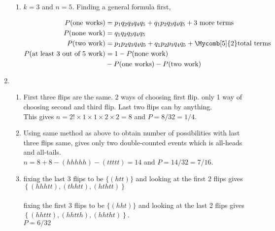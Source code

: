 \begin{enumerate}
\begin{enumerate}
		\item $ k = 3 $ and $ n = 5 $. Finding a general formula first, 
		
		\begin{subequations}
			\begin{align}
				P(\text{one works}) &= p_1 q_2 q_3 q_4 q_5 + q_1 p_2 q_3 q_4 q_5 + \text{3 more terms} \\
				P(\text{none work}) &= q_1 q_2 q_3 q_4 q_5\\
				P(\text{two work}) &= p_1 p_2 q_3 q_4 q_5 + q_1 p_2 p_3 q_4 q_5 + \Mycomb[5]{2}\text{total terms} \\
				P(\text{at least 3 out of 5 work}) &= 1 - P(\text{none work}) \nonumber \\
				&- P(\text{one works}) - P(\text{two work})
			\end{align}
		\end{subequations}
	\end{enumerate}
	
	\item \begin{enumerate}
		\item First three flips are the same. 2 ways of choosing first flip. only 1 way of choosing second and third flip. Last two flips can by anything. \\
		This gives $ n = 2! \times 1 \times 1 \times 2 \times 2  = 8$ and $ P = 8/32 = 1/4 $. \\
		
		\item Using same method as above to obtain number of possibilities with last three flips same, gives only two double-counted events which is all-heads and all-tails. \\
		$ n = 8 + 8 - (hhhhh) - (ttttt)  = 14$ and $ P = 14/32 = 7/16 $.\\
		
		\item fixing the last 3 flips to be $ \{ (htt) \} $ and looking at the first 2 flips gives \\
		$ \left\{ (hhhtt), (thhtt), (hthtt) \right\} $ \\\\
		fixing the first 3 flips to be $ \{ (hht) \} $ and looking at the last 2 flips gives \\
		$ \left\{ (hhttt), (hhtth), (hhtht) \right\} $. \\
		$ P = 6/32 $\\
	\end{enumerate}
	

\end{enumerate}
